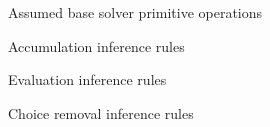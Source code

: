 \begin{figure}
  
  \caption{Assumed base solver primitive operations}%
  \label{fig:vsmt:inf:prim}
\end{figure}
%
\begin{figure}
  
  \caption{Accumulation inference rules}%
  \label{fig:vsmt:inf:acc}
\end{figure}
%
\begin{figure}
  
  \caption{Evaluation inference rules}%
  \label{fig:vsmt:inf:eval}
\end{figure}
%
\begin{figure}
  
  \caption{Choice removal inference rules}%
  \label{fig:vsmt:inf:chc}
\end{figure}





